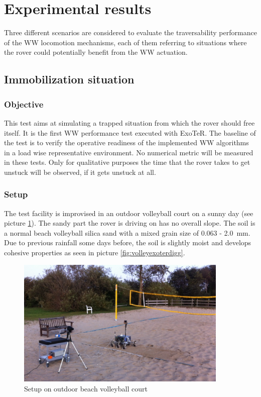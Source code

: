 \documentclass[a4paper,twocolumn]{esapub2005} %
\begin{document}

\section{Experimental results}

Three different scenarios are considered to evaluate the traversability
performance of the WW locomotion mechanisms, each of them referring
to situations where the rover could potentially benefit from the WW
actuation.

\subsection{Immobilization situation} 

\subsubsection{Objective} This test aims at simulating a trapped situation
from which the rover should free itself. It is the first WW
performance test executed with ExoTeR. The baseline of the test is to verify
the operative readiness of the implemented WW algorithms in a load
wise representative environment.
No numerical metric will be measured in these tests. Only for qualitative purposes the time that the rover takes to get unstuck will be observed, if it gets unstuck at all.

\subsubsection{Setup} The test facility is improvised in an outdoor volleyball
court on a sunny day (see picture \ref{fig:volley}). The sandy part the rover
is driving on has no overall slope. The soil is a normal beach volleyball
silica sand with a mixed grain size of 0.063 - 2.0~\unit{mm}. Due to previous rainfall
some days before, the soil is slightly moist and develops cohesive properties
as seen in picture \ref{fig:volleyexoterdigg}. 

\begin{figure}[h!]
    \centering
    \includegraphics[width=0.9\textwidth]{volley.jpg}
    \caption{Setup on outdoor beach volleyball court}
    \label{fig:volley}
\end{figure}
\end{document}
